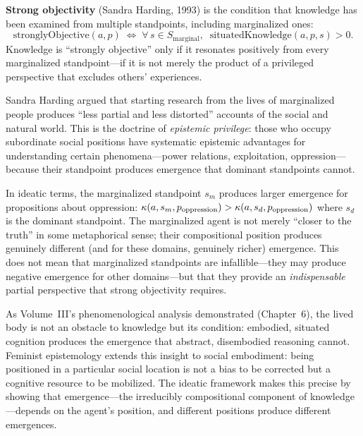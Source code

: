 \begin{definition}
\label{def:strong-objectivity}
\textbf{Strong objectivity} (Sandra Harding, 1993) is the condition that knowledge
has been examined from multiple standpoints, including marginalized ones:
\[
  \mathrm{stronglyObjective}(a, p) \;\iff\;
  \forall\, s \in S_{\mathrm{marginal}},\;\;
  \mathrm{situatedKnowledge}(a, p, s) > 0.
\]
Knowledge is ``strongly objective'' only if it resonates positively from every
marginalized standpoint---if it is not merely the product of a privileged
perspective that excludes others' experiences.
\end{definition}

\begin{interpretation}
Sandra Harding argued that starting research from the lives of marginalized people
produces ``less partial and less distorted'' accounts of the social and natural
world. This is the doctrine of \emph{epistemic privilege}: those who occupy
subordinate social positions have systematic epistemic advantages for
understanding certain phenomena---power relations, exploitation, oppression---
because their standpoint produces emergence that dominant standpoints cannot.

In ideatic terms, the marginalized standpoint $s_m$ produces larger emergence
for propositions about oppression: $\kappa(a, s_m, p_{\text{oppression}}) >
\kappa(a, s_d, p_{\text{oppression}})$ where $s_d$ is the dominant standpoint.
The marginalized agent is not merely ``closer to the truth'' in some
metaphorical sense; their compositional position produces genuinely different
(and for these domains, genuinely richer) emergence. This does not mean that
marginalized standpoints are infallible---they may produce negative emergence
for other domains---but that they provide an \emph{indispensable} partial
perspective that strong objectivity requires.

As Volume~III's phenomenological analysis demonstrated (Chapter~6), the
lived body is not an obstacle to knowledge but its condition: embodied,
situated cognition produces the emergence that abstract, disembodied
reasoning cannot. Feminist epistemology extends this insight to social
embodiment: being positioned in a particular social location is not a bias
to be corrected but a cognitive resource to be mobilized. The ideatic
framework makes this precise by showing that emergence---the irreducibly
compositional component of knowledge---depends on the agent's position,
and different positions produce different emergences.
\end{interpretation}


